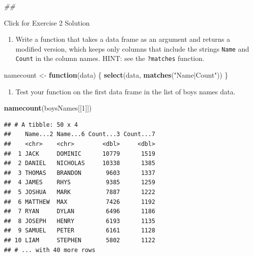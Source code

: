 \documentclass[]{book}
\newenvironment{Shaded}{\begin{snugshade}}{\end{snugshade}}
\newcommand{\CommentTok}[1]{\textcolor[rgb]{0.56,0.35,0.01}{\textit{#1}}}
\newcommand{\ControlFlowTok}[1]{\textcolor[rgb]{0.13,0.29,0.53}{\textbf{#1}}}
\newcommand{\DecValTok}[1]{\textcolor[rgb]{0.00,0.00,0.81}{#1}}
\newcommand{\KeywordTok}[1]{\textcolor[rgb]{0.13,0.29,0.53}{\textbf{#1}}}
\newcommand{\NormalTok}[1]{#1}
\newcommand{\StringTok}[1]{\textcolor[rgb]{0.31,0.60,0.02}{#1}}
\providecommand{\tightlist}{%
  \setlength{\itemsep}{0pt}\setlength{\parskip}{0pt}}
\begin{document}
\begin{Shaded}
\begin{Highlighting}[]
\CommentTok{## }
\end{Highlighting}
\end{Shaded}

{Click for Exercise 2 Solution}

\begin{enumerate}
\def\labelenumi{\arabic{enumi}.}
\tightlist
\item
  Write a function that takes a data frame as an argument and returns a modified version, which keeps only columns that include the strings \texttt{Name} and \texttt{Count} in the column names. HINT: see the \texttt{?matches} function.
\end{enumerate}

\begin{Shaded}
\begin{Highlighting}[]
\NormalTok{  namecount <-}\StringTok{ }\ControlFlowTok{function}\NormalTok{(data) \{}
      \KeywordTok{select}\NormalTok{(data, }\KeywordTok{matches}\NormalTok{(}\StringTok{"Name|Count"}\NormalTok{))}
\NormalTok{  \}}
\end{Highlighting}
\end{Shaded}

\begin{enumerate}
\def\labelenumi{\arabic{enumi}.}
\setcounter{enumi}{1}
\tightlist
\item
  Test your function on the first data frame in the list of boys names data.
\end{enumerate}

\begin{Shaded}
\begin{Highlighting}[]
  \KeywordTok{namecount}\NormalTok{(boysNames[[}\DecValTok{1}\NormalTok{]])}
\end{Highlighting}
\end{Shaded}

\begin{verbatim}
## # A tibble: 50 x 4
##    Name...2 Name...6 Count...3 Count...7
##    <chr>    <chr>        <dbl>     <dbl>
##  1 JACK     DOMINIC      10779      1519
##  2 DANIEL   NICHOLAS     10338      1385
##  3 THOMAS   BRANDON       9603      1337
##  4 JAMES    RHYS          9385      1259
##  5 JOSHUA   MARK          7887      1222
##  6 MATTHEW  MAX           7426      1192
##  7 RYAN     DYLAN         6496      1186
##  8 JOSEPH   HENRY         6193      1135
##  9 SAMUEL   PETER         6161      1128
## 10 LIAM     STEPHEN       5802      1122
## # ... with 40 more rows
\end{verbatim}
\end{document}
